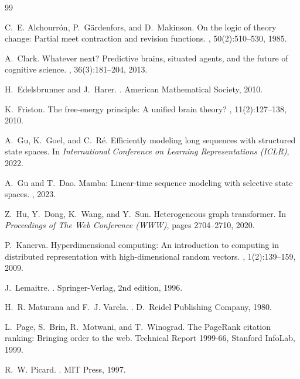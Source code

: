 \documentclass[11pt]{article}
\begin{document}
\begin{thebibliography}{99}

C.~E. Alchourr\'{o}n, P.~G\"{a}rdenfors, and D.~Makinson.
\newblock On the logic of theory change: Partial meet contraction and revision functions.
, 50(2):510--530, 1985.

A.~Clark.
\newblock Whatever next? Predictive brains, situated agents, and the future of cognitive science.
, 36(3):181--204, 2013.

H.~Edelsbrunner and J.~Harer.
.
\newblock American Mathematical Society, 2010.

K.~Friston.
\newblock The free-energy principle: A unified brain theory?
, 11(2):127--138, 2010.

A.~Gu, K.~Goel, and C.~R\'{e}.
\newblock Efficiently modeling long sequences with structured state spaces.
\newblock In {\em International Conference on Learning Representations (ICLR)}, 2022.

A.~Gu and T.~Dao.
\newblock Mamba: Linear-time sequence modeling with selective state spaces.
, 2023.

Z.~Hu, Y.~Dong, K.~Wang, and Y.~Sun.
\newblock Heterogeneous graph transformer.
\newblock In {\em Proceedings of The Web Conference (WWW)}, pages 2704--2710, 2020.

P.~Kanerva.
\newblock Hyperdimensional computing: An introduction to computing in distributed representation with high-dimensional random vectors.
, 1(2):139--159, 2009.

J.~Lemaitre.
.
\newblock Springer-Verlag, 2nd edition, 1996.

H.~R. Maturana and F.~J. Varela.
.
\newblock D.~Reidel Publishing Company, 1980.

L.~Page, S.~Brin, R.~Motwani, and T.~Winograd.
\newblock The PageRank citation ranking: Bringing order to the web.
\newblock Technical Report 1999-66, Stanford InfoLab, 1999.

R.~W. Picard.
.
\newblock MIT Press, 1997.


\end{thebibliography}
\end{document}
